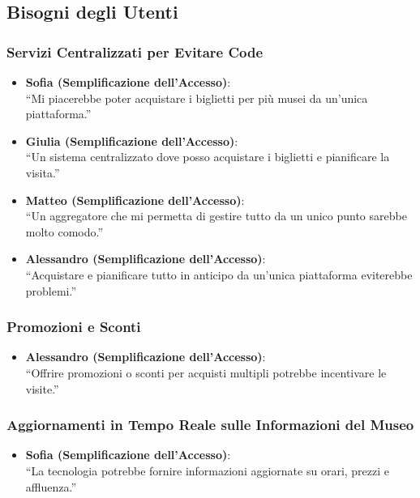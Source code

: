 \documentclass{article}
\begin{document}
\subsection{Bisogni degli Utenti}

\subsubsection{Servizi Centralizzati per Evitare Code}

\begin{itemize}
    \item \textbf{Sofia (Semplificazione dell'Accesso)}:\\
    ``Mi piacerebbe poter acquistare i biglietti per più musei da un'unica piattaforma.''
    \item \textbf{Giulia (Semplificazione dell'Accesso)}:\\
    ``Un sistema centralizzato dove posso acquistare i biglietti e pianificare la visita.''
    \item \textbf{Matteo (Semplificazione dell'Accesso)}:\\
    ``Un aggregatore che mi permetta di gestire tutto da un unico punto sarebbe molto comodo.''
    \item \textbf{Alessandro (Semplificazione dell'Accesso)}:\\
    ``Acquistare e pianificare tutto in anticipo da un'unica piattaforma eviterebbe problemi.''
\end{itemize}

\subsubsection{Promozioni e Sconti}

\begin{itemize}
    \item \textbf{Alessandro (Semplificazione dell'Accesso)}:\\
    ``Offrire promozioni o sconti per acquisti multipli potrebbe incentivare le visite.''
\end{itemize}

\subsubsection{Aggiornamenti in Tempo Reale sulle Informazioni del Museo}

\begin{itemize}
    \item \textbf{Sofia (Semplificazione dell'Accesso)}:\\
    ``La tecnologia potrebbe fornire informazioni aggiornate su orari, prezzi e affluenza.''
\end{itemize}
\end{document}
